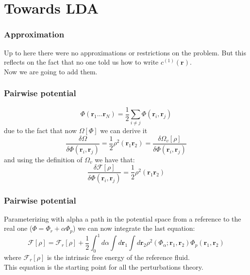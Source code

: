 \documentclass[12pt,notes=off,unicode]{beamer}
\begin{document}
  \section{Towards LDA} %
  \label{sec:towards_lda}
  \begin{frame}[c]\frametitle{Approximation}
    Up to here there were no approximations or restrictions on the problem. But this reflects on the fact that no one told us how to write $ c^{(1)}(\mathbf{r})$.\\

    Now we are going to add them.
  \end{frame}

  \begin{frame}[c]\frametitle{Pairwise potential}
      
  \begin{equation}
    \Phi(\mathbf{r}_1\dots \mathbf{r}_N)=\frac{1}{2}\sum_{i\ne j} \Phi(\mathbf{r}_i,\mathbf{r}_j)
  \end{equation}
    due to the fact that now $\Omega[\Phi]$ we can derive it
  \begin{equation}
    \frac{\delta \Omega}{\delta \Phi(\mathbf{r}_i,\mathbf{r}_j)} = \frac{1}{2} \rho^2(\mathbf{r}_1 \mathbf{r}_2) = \frac{\delta \Omega_v[\rho]}{\delta \Phi(\mathbf{r}_i,\mathbf{r}_j)}
  \end{equation}
  and using the definition of $\Omega_v$ we have that:
  \begin{equation}
    \frac{\delta \mathcal{F}[\rho]}{\delta \Phi(\mathbf{r}_i,\mathbf{r}_j)} = \frac{1}{2} \rho^2(\mathbf{r}_1 \mathbf{r}_2)
  \end{equation}
  \end{frame}

  \begin{frame}[c]\frametitle{Pairwise potential}
    Parameterizing with alpha a path in the potential space from a reference to the real one ($\Phi = \Phi_r + \alpha \Phi_p$) we can now integrate the last equation:
    \begin{equation}
      \mathcal{F}[\rho] = \mathcal{F}_r[\rho]+\frac{1}{2} \int_0^1 d \alpha \int d \mathbf{r}_1 \int d\mathbf{r}_2 \rho^2(\Phi_\alpha; \mathbf{r}_1, \mathbf{r}_2) \Phi_p(\mathbf{r}_1,\mathbf{r}_2)
    \end{equation}
    where $\mathcal{F}_r[\rho]$ is the intrinsic free energy of the reference fluid.\\
    \smallskip
    This equation is the starting point for all the perturbations theory.
  \end{frame}
\end{document}
